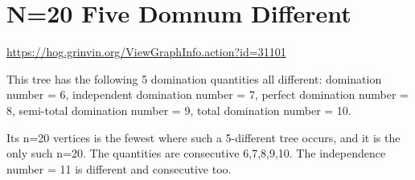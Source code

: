 \documentclass{article}
\begin{document}
\begin{center}
\end{center}


\clearpage
\section{N=20 Five Domnum Different}

\url{https://hog.grinvin.org/ViewGraphInfo.action?id=31101}

\smallskip

This tree has the following 5 domination quantities all different: \newline
domination number = 6, \newline
independent domination number = 7, \newline
perfect domination number = 8, \newline
semi-total domination number = 9, \newline
total domination number = 10.

Its n=20 vertices is the fewest where such a 5-different tree occurs,
and it is the only such n=20.  The quantities are consecutive
6,7,8,9,10.  The independence number = 11 is different and consecutive
too.
\end{document}
